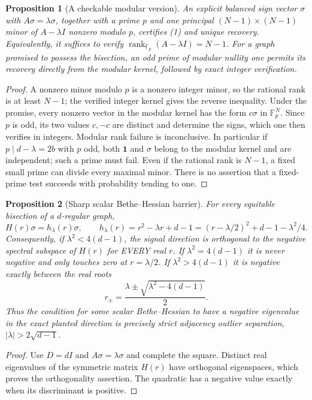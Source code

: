 \documentclass[11pt]{article}
\newtheorem{proposition}{Proposition}
\newcommand{\one}{\mathbf 1}
\newcommand{\F}{\mathbb F}
\begin{document}
\begin{proposition}[A checkable modular version]
An explicit balanced sign vector $\sigma$ with $A\sigma=\lambda\sigma$,
together with a prime $p$ and one principal $(N-1)\times(N-1)$ minor of
$A-\lambda I$ nonzero modulo $p$, certifies (1) and unique recovery.
Equivalently, it suffices to verify
$\operatorname{rank}_{\F_p}(A-\lambda I)=N-1$.
For a graph promised to possess the bisection, an odd prime of modular
nullity one permits its recovery directly from the modular kernel,
followed by exact integer verification.
\end{proposition}
\begin{proof}
A nonzero minor modulo $p$ is a nonzero integer minor, so the rational
rank is at least $N-1$; the verified integer kernel gives the reverse
inequality. Under the promise, every nonzero vector in the modular kernel
has the form $c\sigma$ in $\F_p^N$. Since $p$ is odd, its two values
$c,-c$ are distinct and determine the signs, which one then verifies in
integers. Modular rank failure is inconclusive. In particular if
$p\mid d-\lambda=2b$ with $p$ odd, both $\one$ and $\sigma$ belong
to the modular kernel and are independent; such a prime must fail.
Even if the rational rank is $N-1$, a fixed small prime can divide every
maximal minor. There is no assertion that a fixed-prime test succeeds
with probability tending to one.
\end{proof}

\begin{proposition}[Sharp scalar Bethe--Hessian barrier]
For every equitable bisection of a $d$-regular graph,
\[
 H(r)\sigma=h_\lambda(r)\sigma,
 \qquad h_\lambda(r)=r^2-\lambda r+d-1
 =\left(r-\lambda/2\right)^2+d-1-\lambda^2/4.       \tag{2}
\]
Consequently, if $\lambda^2<4(d-1)$, the signal direction is orthogonal
to the negative spectral subspace of $H(r)$ for EVERY real $r$.
If $\lambda^2=4(d-1)$ it is never negative and only touches zero at
$r=\lambda/2$. If $\lambda^2>4(d-1)$ it is negative exactly between
the real roots
\[
 r_\pm=\frac{\lambda\pm\sqrt{\lambda^2-4(d-1)}}2.   \tag{3}
\]
Thus the condition for some scalar Bethe--Hessian to have a negative
eigenvalue in the exact planted direction is precisely strict adjacency
outlier separation, $|\lambda|>2\sqrt{d-1}$.
\end{proposition}
\begin{proof}
Use $D=dI$ and $A\sigma=\lambda\sigma$ and complete the square.
Distinct real eigenvalues of the symmetric matrix $H(r)$ have orthogonal
eigenspaces, which proves the orthogonality assertion. The quadratic
has a negative value exactly when its discriminant is positive.
\end{proof}
\end{document}
